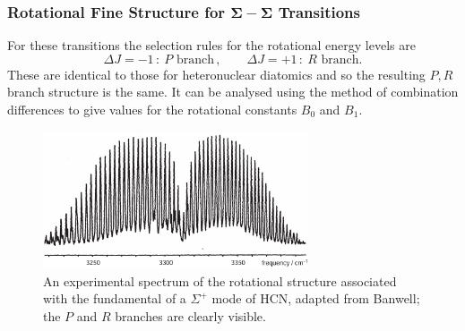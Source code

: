 \documentclass{article}
\theoremstyle{plain}\theoremheaderfont{\normalfont\itshape}\theorembodyfont{\rmfamily}\theoremseparator{.}\newtheorem*{rem}{Remark}\newtheorem*{ex}{Example}\newtheorem*{proof}{Proof}\newtheorem*{altp}{Alternative proof}
\theoremstyle{plain}\theoremheaderfont{\normalfont\bfseries}\theorembodyfont{\rmfamily}\theoremseparator{.}\newtheorem{thm}{Theorem}[section]\newtheorem{lem}[thm]{Lemma}\newtheorem{prop}[thm]{Proposition}\newtheorem*{cor}{Corollary}\newtheorem{defn}[thm]{Definition}\newtheorem{clm}[thm]{Claim}\newtheorem{clminproof}{Claim}\newtheorem{pos}{Postulate}[section]
\theoremstyle{break}\theoremheaderfont{\normalfont\itshape}\theorembodyfont{\rmfamily}\theoremseparator{.\medskip}\newtheorem*{proofskip}{Proof}\newtheorem*{exs}{Examples}\newtheorem*{rems}{Remarks}
\theoremstyle{break}\theoremheaderfont{\normalfont\bfseries}\theorembodyfont{\rmfamily}\theoremseparator{.\medskip}\newtheorem{lemskip}[thm]{Lemma}\newtheorem{defnskip}[thm]{Definition}\newtheorem{propskip}[thm]{Proposition}\newtheorem{thmskip}[thm]{Theorem}
\numberwithin{equation}{section}
\begin{document}
    \subsubsection*{Rotational Fine Structure for \texorpdfstring{\(\bm{\Sigma-\Sigma}\)}{Σ-Σ} Transitions}
    For these transitions the selection rules for the rotational energy levels are
    \begin{equation}
        \Delta J=-1\,:\ P\text{ branch}\,,\qquad\Delta J=+1\,:\ R\text{ branch.}
    \end{equation}
    These are identical to those for heteronuclear diatomics and so the resulting \(P,R\) branch structure is the same. It can be analysed using the method of combination differences to give values for the rotational constants \(B_0\) and \(B_1\).
    
    \begin{figure}
        \centering
        \includegraphics[width=0.7\textwidth]{HCN_vibrot_sigma.png}
        \caption{An experimental spectrum of the rotational structure associated with the fundamental of a \(\Sigma^+\) mode of \(\mathrm{HCN}\), adapted from Banwell; the \(P\) and \(R\) branches are clearly visible.}
    \end{figure}
\end{document}
